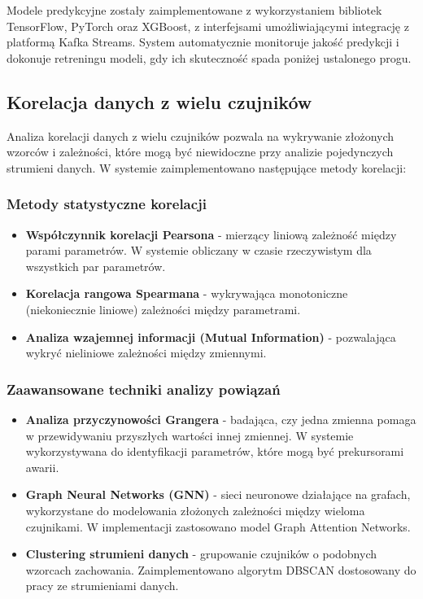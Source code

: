 Modele predykcyjne zostały zaimplementowane z wykorzystaniem bibliotek TensorFlow, PyTorch oraz XGBoost, z interfejsami umożliwiającymi integrację z platformą Kafka Streams. System automatycznie monitoruje jakość predykcji i dokonuje retreningu modeli, gdy ich skuteczność spada poniżej ustalonego progu.

\subsection{Korelacja danych z wielu czujników}
\label{subsec:korelacja_danych}

Analiza korelacji danych z wielu czujników pozwala na wykrywanie złożonych wzorców i zależności, które mogą być niewidoczne przy analizie pojedynczych strumieni danych. W systemie zaimplementowano następujące metody korelacji:

\subsubsection{Metody statystyczne korelacji}
\label{subsubsec:statystyczne_korelacje}

\begin{itemize}
    \item \textbf{Współczynnik korelacji Pearsona} - mierzący liniową zależność między parami parametrów. W systemie obliczany w czasie rzeczywistym dla wszystkich par parametrów.
    \item \textbf{Korelacja rangowa Spearmana} - wykrywająca monotoniczne (niekoniecznie liniowe) zależności między parametrami.
    \item \textbf{Analiza wzajemnej informacji (Mutual Information)} - pozwalająca wykryć nieliniowe zależności między zmiennymi.
\end{itemize}

\subsubsection{Zaawansowane techniki analizy powiązań}
\label{subsubsec:zaawansowane_korelacje}

\begin{itemize}
    \item \textbf{Analiza przyczynowości Grangera} - badająca, czy jedna zmienna pomaga w przewidywaniu przyszłych wartości innej zmiennej. W systemie wykorzystywana do identyfikacji parametrów, które mogą być prekursorami awarii.
    \item \textbf{Graph Neural Networks (GNN)} - sieci neuronowe działające na grafach, wykorzystane do modelowania złożonych zależności między wieloma czujnikami. W implementacji zastosowano model Graph Attention Networks.
    \item \textbf{Clustering strumieni danych} - grupowanie czujników o podobnych wzorcach zachowania. Zaimplementowano algorytm DBSCAN dostosowany do pracy ze strumieniami danych.
\end{itemize}


